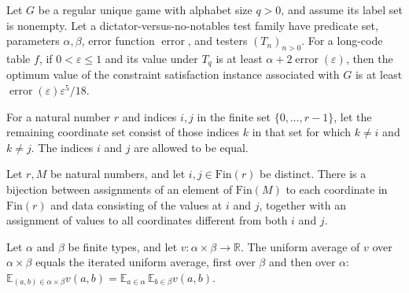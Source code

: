 \begin{theorem}
\label{FABL.RegularUniqueGame.error_mul_epsilon_pow_five_div_eighteen_le_optimum}
\leanok
{}
Let $G$ be a regular unique game with alphabet size $q>0$, and assume its label set is nonempty. Let a dictator-versus-no-notables test family have predicate set, parameters $\alpha,\beta$, error function $\operatorname{error}$, and testers $(T_n)_{n>0}$. For a long-code table $f$, if $0<\varepsilon\leq1$ and its value under $T_q$ is at least $\alpha+2\operatorname{error}(\varepsilon)$, then the optimum value of the constraint satisfaction instance associated with $G$ is at least $\operatorname{error}(\varepsilon)\varepsilon^5/18$.
\end{theorem}

\begin{definition}
\label{FABL.CloneRest}
\leanok
For a natural number $r$ and indices $i,j$ in the finite set $\{0,\ldots,r-1\}$, let
the remaining coordinate set consist of those indices $k$ in that set for which $k\ne i$
and $k\ne j$. The indices $i$ and $j$ are allowed to be equal.
\end{definition}

\begin{definition}
\label{FABL.clonePairEquiv}
\leanok
{}
Let $r,M$ be natural numbers, and let $i,j\in\text{Fin}(r)$ be distinct. There is a
bijection between assignments of an element of $\text{Fin}(M)$ to each coordinate in
$\text{Fin}(r)$ and data consisting of the values at $i$ and $j$, together with an
assignment of values to all coordinates different from both $i$ and $j$.
\end{definition}

\begin{theorem}
\label{FABL.fintype_expect_prod}
\leanok
{}
Let $\alpha$ and $\beta$ be finite types, and let $v:\alpha\times\beta\to\mathbb R$. The
uniform average of $v$ over $\alpha\times\beta$ equals the iterated uniform average,
first over $\beta$ and then over $\alpha$: $\mathbb
E_{(a,b)\in\alpha\times\beta}v(a,b)=\mathbb E_{a\in\alpha}\,\mathbb
E_{b\in\beta}v(a,b)$.
\end{theorem}

